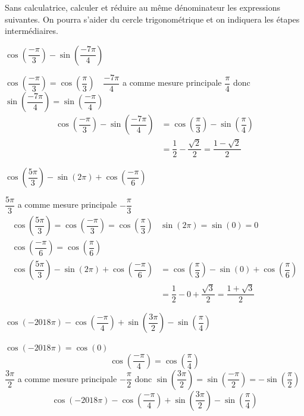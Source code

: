 \documentclass[11pt,a4paper]{article}  %
\begin{document}
Sans calculatrice, calculer et réduire au même dénominateur les expressions suivantes. On pourra s'aider du cercle trigonométrique et on indiquera les étapes intermédiaires.
\begin{enumMet}
	\item $\cos \left(\dfrac{-\pi}{3}\right)-\sin \left(\dfrac{-7 \pi}{4}\right)$
	\begin{corrBox}
		$\cos \left(\dfrac{-\pi}{3}\right)=\cos \left(\dfrac{\pi}{3}\right) \quad \dfrac{-7 \pi}{4}$ a comme mesure principale $\dfrac{\pi}{4}$ donc $\sin \left(\dfrac{-7 \pi}{4}\right)=\sin \left(\dfrac{-\pi}{4}\right)$
		$$
		\begin{aligned}
			\cos \left(\dfrac{-\pi}{3}\right)-\sin \left(\dfrac{-7 \pi}{4}\right) & =\cos \left(\dfrac{\pi}{3}\right)-\sin \left(\dfrac{\pi}{4}\right) \\
			& =\dfrac{1}{2}-\dfrac{\sqrt{2}}{2}=\dfrac{1-\sqrt{2}}{2}
		\end{aligned}
		$$		
	\end{corrBox}
	\item $\cos \left(\dfrac{5 \pi}{3}\right)-\sin (2 \pi)+\cos \left(\dfrac{-\pi}{6}\right)$
	\begin{corrBox}
		$\dfrac{5 \pi}{3}$ a comme mesure principale $-\dfrac{\pi}{3}$
		$$
		\begin{aligned}
			\cos \left(\dfrac{5 \pi}{3}\right)=\cos \left(\dfrac{-\pi}{3}\right)=\cos \left(\dfrac{\pi}{3}\right) & \sin (2 \pi)=\sin (0)=0 \\
			\cos \left(\dfrac{-\pi}{6}\right)=\cos \left(\dfrac{\pi}{6}\right) & \\
			\cos \left(\dfrac{5 \pi}{3}\right)-\sin (2 \pi)+\cos \left(\dfrac{-\pi}{6}\right) & =\cos \left(\dfrac{\pi}{3}\right)-\sin (0)+\cos \left(\dfrac{\pi}{6}\right) \\
			& =\dfrac{1}{2}-0+\dfrac{\sqrt{3}}{2}=\dfrac{1+\sqrt{3}}{2}
		\end{aligned}
		$$		
	\end{corrBox}
	\item $\cos (-2018 \pi)-\cos \left(\dfrac{-\pi}{4}\right)+\sin \left(\dfrac{3 \pi}{2}\right)-\sin \left(\dfrac{\pi}{4}\right)$
	\begin{corrBox}
		$\cos (-2018 \pi)=\cos (0)$
		$$
		\cos \left(\dfrac{-\pi}{4}\right)=\cos \left(\dfrac{\pi}{4}\right)
		$$
		$\dfrac{3 \pi}{2}$ a comme mesure principale $-\dfrac{\pi}{2}$
		donc $\sin \left(\dfrac{3 \pi}{2}\right)=\sin \left(\dfrac{-\pi}{2}\right)=-\sin \left(\dfrac{\pi}{2}\right)$
		$$
		\cos (-2018 \pi)-\cos \left(\dfrac{-\pi}{4}\right)+\sin \left(\dfrac{3 \pi}{2}\right)-\sin \left(\dfrac{\pi}{4}\right)
$$
\end{corrBox}
\end{enumMet}
\end{document}
